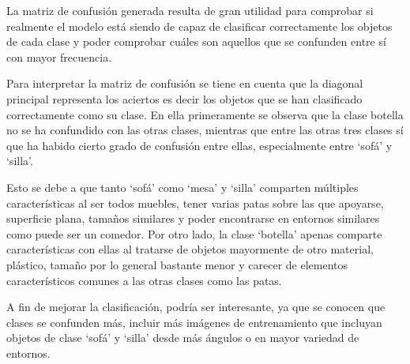     La matriz de confusión generada resulta de gran utilidad para comprobar si realmente el modelo está siendo de capaz de clasificar correctamente los objetos de cada clase y poder comprobar cuáles son aquellos que se confunden entre sí con mayor frecuencia.

    Para interpretar la matriz de confusión se tiene en cuenta que la diagonal principal representa los aciertos es decir los objetos que se han clasificado correctamente como su clase. En ella primeramente se observa que la clase botella no se ha confundido con las otras clases, mientras que entre las otras tres clases sí que ha habido cierto grado de confusión entre ellas, especialmente entre `sofá' y `silla'.

    Esto se debe a que tanto `sofá' como `mesa' y `silla' comparten múltiples características al ser todos muebles, tener varias patas sobre las que apoyarse, superficie plana, tamaños similares y poder encontrarse en entornos similares como puede ser un comedor. Por otro lado, la clase `botella' apenas comparte características con ellas al tratarse de objetos mayormente de otro material, plástico, tamaño por lo general bastante menor y carecer de elementos característicos comunes a las otras clases como las patas.

    A fin de mejorar la clasificación, podría ser interesante, ya que se conocen que clases se confunden más, incluir más imágenes de entrenamiento que incluyan objetos de clase `sofá' y `silla' desde más ángulos o en mayor variedad de entornos.


